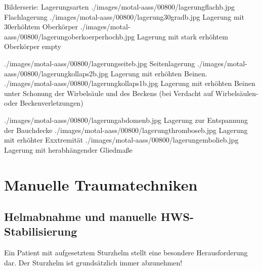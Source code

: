 \documentclass[
ngerman,
paper=a4,
asymmetric,
fontsize=8pt,
draft=false,
numbers=noenddot,
bibtotocnumbered,
footnotes=multiple,
toc=flat,
]{scrbook}
\begin{document}
\begin{PictureSeriesWide}{}{Bilderserie: Lagerungsarten}
{./images/motal-aass/00800/lagerungflachb.jpg}
{Flachlagerung}
{./images/motal-aass/00800/lagerung30gradb.jpg}
{Lagerung mit 30\Deg erhöhtem Oberkörper}
{./images/motal-aass/00800/lagerungoberkoerperhochb.jpg}
{Lagerung mit stark erhöhtem Oberkörper }
{empty}
{}

{./images/motal-aass/00800/lagerungseiteb.jpg}
{Seitenlagerung}
{./images/motal-aass/00800/lagerungkollaps2b.jpg}
{Lagerung mit erhöhten Beinen.}
{./images/motal-aass/00800/lagerungkollaps1b.jpg}
{Lagerung mit
erhöhten Beinen unter Schonung der Wirbelsäule und des
Beckens (bei Verdacht auf Wirbelsäulen- oder
Beckenverletzungen)}
{}
{}

{./images/motal-aass/00800/lagerungabdomenb.jpg}
{Lagerung zur Entspannung der Bauchdecke}
{./images/motal-aass/00800/lagerungthromboseb.jpg}
{Lagerung mit erhöhter Exxtremität}
{./images/motal-aass/00800/lagerungembolieb.jpg}
{Lagerung mit herabhängender Gliedmaße}
{}
{}
\end{PictureSeriesWide}


\section{Manuelle Traumatechniken}


\subsection{Helmabnahme und manuelle HWS-Stabilisierung}
\label{topic:helmabnahme}
\label{topic:hws-stabilisierung-manuell}


\Text{\TxBeschreibung}
{Ein Patient mit aufgesetztem Sturzhelm stellt eine 
besondere Herausforderung dar. Der Sturzhelm ist
grundsätzlich immer abzunehmen! }{}{}{}{}
\end{document}
